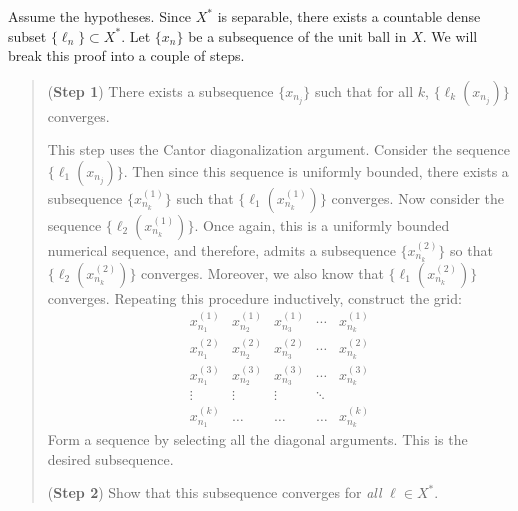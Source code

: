 \documentclass{article}
\begin{document}
\begin{itemize}
	\begin{solutions}
		Assume the hypotheses. Since $X^{\ast}$ is separable, there exists a countable dense subset $\{\ell_{n}\} \subset X^{\ast}$. Let $\{x_{n}\}$ be a subsequence of the unit ball in $X$. We will break this proof into a couple of steps. 
		\begin{quote}
			(\textbf{Step 1}) There exists a subsequence $\{x_{n_{j}}\}$ such that for all $k$, $\{\ell_{k}(x_{n_{j}})\}$ converges. 
			
			This step uses the Cantor diagonalization argument. Consider the sequence $\{\ell_{1}(x_{n_{j}})\}$. Then since this sequence is uniformly bounded, there exists a subsequence $\{x_{n_{k}}^{(1)}\}$ such that $\{\ell_{1}(x_{n_{k}}^{(1)})\}$ converges. Now consider the sequence $\{\ell_{2}(x_{n_{k}}^{(1)})\}$. Once again, this is a uniformly bounded numerical sequence, and therefore, admits a subsequence $\{x_{n_{k}}^{(2)}\}$ so that $\{\ell_{2}(x_{n_{k}}^{(2)})\}$ converges. Moreover, we also know that $\{\ell_{1}(x_{n_{k}}^{(2)})\}$ converges. Repeating this procedure inductively, construct the grid: 
			\begin{equation}
				\begin{matrix}
					x_{n_{1}}^{(1)} & x_{n_{2}}^{(1)} & x_{n_{3}}^{(1)} & \dotsm & x_{n_{k}}^{(1)} \\
					x_{n_{1}}^{(2)} & x_{n_{2}}^{(2)} & x_{n_{3}}^{(2)} & \dotsm & x_{n_{k}}^{(2)}\\
					x_{n_{1}}^{(3)} & x_{n_{2}}^{(3)} & x_{n_{3}}^{(3)} & \dotsm & x_{n_{k}}^{(3)}\\
					\vdots & \vdots & \vdots & \ddots \\
					x_{n_{1}}^{(k)} & \ldots & \ldots & \ldots &  x_{n_{k}}^{(k)} 
				\end{matrix}
			\end{equation} 
			Form a sequence by selecting all the diagonal arguments. This is the desired subsequence. 
			
			(\textbf{Step 2}) Show that this subsequence converges for \textit{all} $\ell \in X^{\ast}$.
			

\end{quote}
\end{solutions}
\end{itemize}
\end{document}
